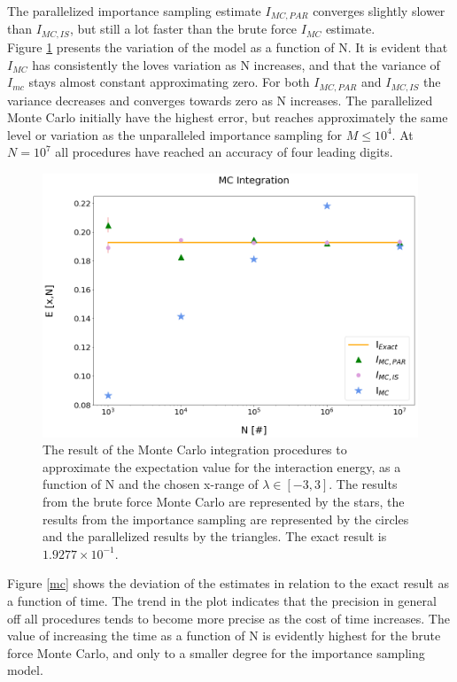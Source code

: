 \documentclass[%
reprint,
amsmath,amssymb,
aps,
]{revtex4-1}
\begin{document}
\noindent The parallelized importance sampling estimate $I_{MC,PAR}$ converges slightly slower than $I_{MC,IS}$, but still a lot faster than the brute force $I_{MC}$ estimate. \\ \indent 
Figure \ref{mc_err} presents the variation of the model as a function of N. It is evident that $I_{MC}$ has consistently the loves variation as N increases, and that the variance of $I_{mc}$ stays almost constant approximating zero. For both $I_{MC,PAR}$ and $I_{MC,IS}$ the variance decreases and converges towards zero as N increases. The parallelized Monte Carlo initially have the highest error, but reaches approximately the same level or variation as the unparalleled importance sampling for $M \leq 10^4$. At $N=10^7$ all procedures have reached an accuracy of four leading digits. \\ 
\begin{figure}[H]
	\vspace{10mm}
	\includegraphics[width=\textwidth]{MC_integration.png}
	\caption{\label{mc_err} The result of the Monte Carlo integration procedures to approximate the expectation value for the interaction energy, as a function of N and the chosen x-range of $\lambda \in[-3,3]$. The results from the brute force Monte Carlo are represented by the stars, the results from the importance sampling are represented by the circles and the parallelized results by the triangles. The exact result is $1.9277\times 10^{-1}$. }
\end{figure}
\newpage
Figure \ref{mc} shows the deviation of the estimates in relation to the exact result as a function of time. The trend in the plot indicates that the precision in general off all procedures tends to become more precise as the cost of time increases. The value of increasing the time as a function of N is evidently highest for the brute force Monte Carlo, and only to a smaller degree for the importance sampling model. \\ \indent 
\end{document}
